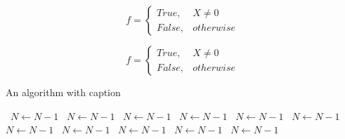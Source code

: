 \documentclass[a4paper]{article}
\begin{document}
\begin{equation}   f =
\begin{cases} True, & X \neq 0\\
False, & otherwise
\end{cases}
\end{equation}

\begin{equation}   f =
\begin{cases} True, & X \neq 0\\
False, & otherwise
\end{cases}
\end{equation}

\begin{algorithm}
\caption{An algorithm with caption}
\begin{algorithmic}
\    \State $N \gets N - 1$
\    \State $N \gets N - 1$
\    \State $N \gets N - 1$
\    \State $N \gets N - 1$
\    \State $N \gets N - 1$
\    \State $N \gets N - 1$
\    \State $N \gets N - 1$
\    \State $N \gets N - 1$
\    \State $N \gets N - 1$
\    \State $N \gets N - 1$
\    \State $N \gets N - 1$
\EndWhile
\end{algorithmic}
\end{algorithm}
\end{document}
